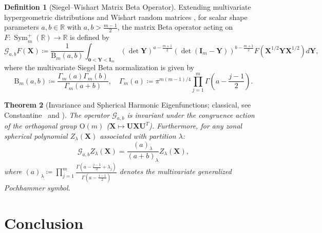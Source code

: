 \documentclass[11pt,a4paper]{article}
\theoremstyle{plain}
\newtheorem{theorem}{Theorem}[section]
\theoremstyle{definition}
\newtheorem{definition}[theorem]{Definition}
\theoremstyle{remark}
\numberwithin{equation}{section}
\begin{document}
\begin{definition}[Siegel--Wishart Matrix Beta Operator]
Extending multivariate hypergeometric distributions and Wishart random matrices \cite{muirhead2009}, for scalar shape parameters $a, b \in \mathbb{R}$ with $a, b > \frac{m-1}{2}$, the matrix Beta operator acting on $F: \operatorname{Sym}_m^+(\mathbb{R}) \to \mathbb{R}$ is defined by
\begin{equation}
\mathcal{G}_{a, b} F(\mathbf{X}) \coloneqq \frac{1}{\mathrm{B}_m(a, b)} \int_{\mathbf{0} < \mathbf{Y} < \mathbf{I}_m} (\det \mathbf{Y})^{a - \frac{m+1}{2}} (\det(\mathbf{I}_m - \mathbf{Y}))^{b - \frac{m+1}{2}} F\left(\mathbf{X}^{1/2} \mathbf{Y} \mathbf{X}^{1/2}\right) d\mathbf{Y},
\end{equation}
where the multivariate Siegel Beta normalization is given by
\begin{equation}
\mathrm{B}_m(a, b) \coloneqq \frac{\Gamma_m(a)\Gamma_m(b)}{\Gamma_m(a+b)}, \quad \Gamma_m(a) \coloneqq \pi^{m(m-1)/4}\prod_{j=1}^m \Gamma\left(a - \frac{j-1}{2}\right).
\end{equation}
\end{definition}

\begin{theorem}[Invariance and Spherical Harmonic Eigenfunctions; classical, see Constantine~\cite{constantine1963} and {\cite[Ch.~7]{muirhead2009}}]
\label{thm:siegel_wishart_invariance}
The operator $\mathcal{G}_{a, b}$ is invariant under the congruence action of the orthogonal group $\mathrm{O}(m)$ ($\mathbf{X} \mapsto \mathbf{U}\mathbf{X}\mathbf{U}^T$). Furthermore, for any zonal spherical polynomial $Z_\lambda(\mathbf{X})$ associated with partition $\lambda$:
\begin{equation}
\mathcal{G}_{a, b} Z_\lambda(\mathbf{X}) = \frac{(a)_\lambda}{(a+b)_\lambda} Z_\lambda(\mathbf{X}),
\end{equation}
where $(a)_\lambda \coloneqq \prod_{j=1}^m \frac{\Gamma\left(a - \frac{j-1}{2} + \lambda_j\right)}{\Gamma\left(a - \frac{j-1}{2}\right)}$ denotes the multivariate generalized Pochhammer symbol.
\end{theorem}

\section{Conclusion}
\end{document}
